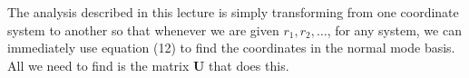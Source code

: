 \documentclass{article}
\begin{document}
The analysis described in this lecture is simply transforming from one coordinate system to another so that whenever we are given $r_1, r_2, \dots$, for any system, we can immediately use equation (12) to find the coordinates in the normal mode basis. All we need to find is the matrix \textbf{U} that does this.
\end{document}
